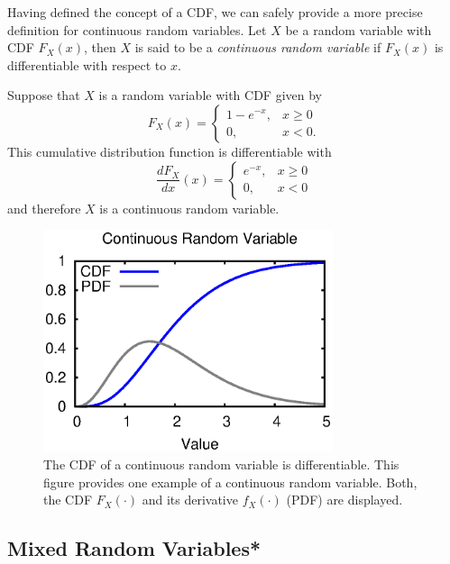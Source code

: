 Having defined the concept of a CDF, we can safely provide a more precise definition for continuous random variables.
Let $X$ be a random variable with CDF $F_X (x)$, then $X$ is said to be a \emph{continuous random variable} if $F_X (x)$ is differentiable with respect to $x$. 

\begin{example}
Suppose that $X$ is a random variable with CDF given by
\begin{equation*}
F_X(x) = \begin{cases} 1 - e^{-x}, & x \geq 0 \\
0, & x < 0 . \end{cases}
\end{equation*}
This cumulative distribution function is differentiable with
\begin{equation*}
\frac{dF_X}{dx}(x)
= \begin{cases} e^{-x}, & x \geq 0 \\
0, & x < 0 \end{cases}
\end{equation*}
and therefore $X$ is a continuous random variable.
\end{example}

\begin{figure}[ht]
\begin{center}
\includegraphics[width=8.5cm]{Figures/8chapter/continuous_cdf}
\end{center}
\caption{The CDF of a continuous random variable is differentiable.
This figure provides one example of a continuous random variable.
Both, the CDF $F_X(\cdot)$ and its derivative $f_X(\cdot)$ (PDF) are displayed.}
\end{figure}


\subsection{Mixed Random Variables*}

